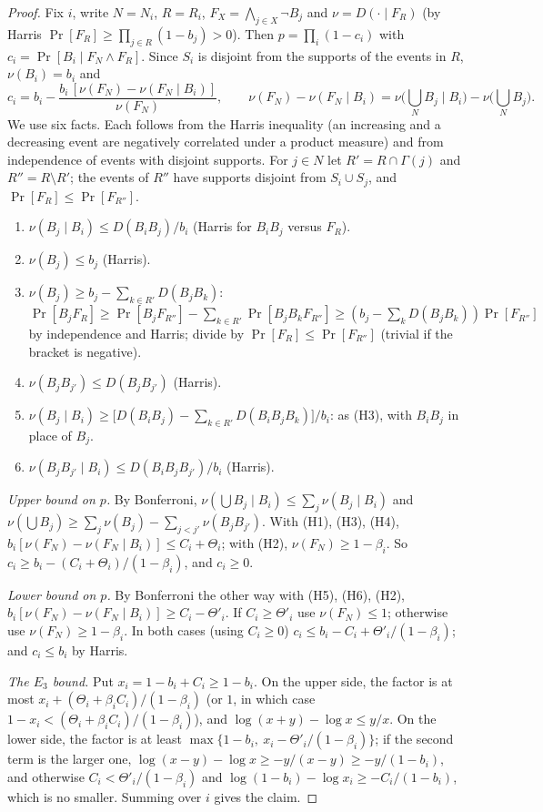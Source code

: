 \begin{proof}
Fix $i$, write $N=N_i$, $R=R_i$, $F_X=\bigwedge_{j\in X}\neg B_j$ and
$\nu=D(\cdot\mid F_R)$ (by Harris $\Pr[F_R]\ge\prod_{j\in R}(1-b_j)>0$). Then $p=\prod_i(1-c_i)$ with $c_i=\Pr[B_i\mid F_N\wedge F_R]$.
Since $S_i$ is disjoint from the supports of the events in $R$, $\nu(B_i)=b_i$ and
\[
c_i=b_i-\frac{b_i\,[\nu(F_N)-\nu(F_N\mid B_i)]}{\nu(F_N)},\qquad
\nu(F_N)-\nu(F_N\mid B_i)=\nu\big(\textstyle\bigcup_NB_j\mid B_i\big)-\nu\big(\textstyle\bigcup_NB_j\big).
\]
We use six facts. Each follows from the Harris inequality (an increasing and a
decreasing event are negatively correlated under a product measure) and from
independence of events with disjoint supports. For $j\in N$ let $R'=R\cap\Gamma(j)$
and $R''=R\setminus R'$; the events of $R''$ have supports disjoint from
$S_i\cup S_j$, and $\Pr[F_R]\le\Pr[F_{R''}]$.
\begin{enumerate}[label=(H\arabic*)]
\item $\nu(B_j\mid B_i)\le D(B_iB_j)/b_i$ (Harris for $B_iB_j$ versus $F_R$).
\item $\nu(B_j)\le b_j$ (Harris).
\item $\nu(B_j)\ge b_j-\sum_{k\in R'}D(B_jB_k)$: $\Pr[B_jF_R]\ge\Pr[B_jF_{R''}]-\sum_{k\in
R'}\Pr[B_jB_kF_{R''}]\ge(b_j-\sum_kD(B_jB_k))\Pr[F_{R''}]$ by independence and Harris;
divide by $\Pr[F_R]\le\Pr[F_{R''}]$ (trivial if the bracket is negative).
\item $\nu(B_jB_{j'})\le D(B_jB_{j'})$ (Harris).
\item $\nu(B_j\mid B_i)\ge\big[D(B_iB_j)-\sum_{k\in R'}D(B_iB_jB_k)\big]/b_i$: as (H3), with
$B_iB_j$ in place of $B_j$.
\item $\nu(B_jB_{j'}\mid B_i)\le D(B_iB_jB_{j'})/b_i$ (Harris).
\end{enumerate}
\emph{Upper bound on $p$.} By Bonferroni, $\nu(\bigcup B_j\mid B_i)\le\sum_j\nu(B_j\mid
B_i)$ and $\nu(\bigcup B_j)\ge\sum_j\nu(B_j)-\sum_{j<j'}\nu(B_jB_{j'})$. With (H1), (H3),
(H4), $b_i[\nu(F_N)-\nu(F_N\mid B_i)]\le C_i+\Theta_i$; with (H2), $\nu(F_N)\ge1-\beta_i$.
So $c_i\ge b_i-(C_i+\Theta_i)/(1-\beta_i)$, and $c_i\ge0$.

\emph{Lower bound on $p$.} By Bonferroni the other way with (H5), (H6), (H2),
$b_i[\nu(F_N)-\nu(F_N\mid B_i)]\ge C_i-\Theta'_i$. If $C_i\ge\Theta'_i$ use
$\nu(F_N)\le1$; otherwise use $\nu(F_N)\ge1-\beta_i$. In both cases (using $C_i\ge0$)
$c_i\le b_i-C_i+\Theta'_i/(1-\beta_i)$; and $c_i\le b_i$ by Harris.

\emph{The $E_3$ bound.} Put $x_i=1-b_i+C_i\ge1-b_i$. On the upper side, the factor is
at most $x_i+(\Theta_i+\beta_iC_i)/(1-\beta_i)$ (or $1$, in which case
$1-x_i<(\Theta_i+\beta_iC_i)/(1-\beta_i)$), and $\log(x+y)-\log x\le y/x$. On the lower
side, the factor is at least $\max\{1-b_i,\ x_i-\Theta'_i/(1-\beta_i)\}$; if the
second term is the larger one, $\log(x-y)-\log x\ge-y/(x-y)\ge-y/(1-b_i)$, and
otherwise $C_i<\Theta'_i/(1-\beta_i)$ and $\log(1-b_i)-\log x_i\ge-C_i/(1-b_i)$, which is
no smaller. Summing over $i$ gives the claim.
\end{proof}

